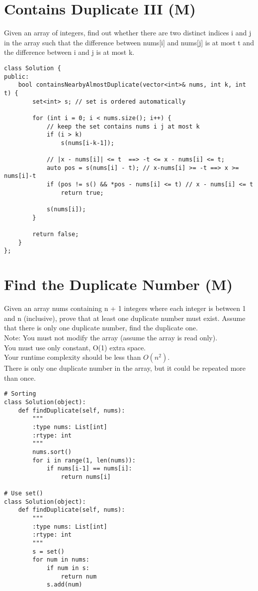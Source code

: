 \section{Contains Duplicate III (M)}
Given an array of integers, find out whether there are two distinct indices i and j in the array such that the difference between nums[i] and nums[j] is at most t and the difference between i and j is at most k. \\

\begin{lstlisting}
class Solution {
public:
    bool containsNearbyAlmostDuplicate(vector<int>& nums, int k, int t) {
        set<int> s; // set is ordered automatically 
        
        for (int i = 0; i < nums.size(); i++) {
            // keep the set contains nums i j at most k
            if (i > k) 
                s(nums[i-k-1]); 
            
            // |x - nums[i]| <= t  ==> -t <= x - nums[i] <= t;
            auto pos = s(nums[i] - t); // x-nums[i] >= -t ==> x >= nums[i]-t 
            if (pos != s() && *pos - nums[i] <= t) // x - nums[i] <= t
                return true;
            
            s(nums[i]);
        }
        
        return false;
    }
};
\end{lstlisting}


\section{Find the Duplicate Number (M)}
Given an array nums containing n + 1 integers where each integer is between 1 and n (inclusive), prove that at least one duplicate number must exist. Assume that there is only one duplicate number, find the duplicate one. \\

Note:
    You must not modify the array (assume the array is read only).\\
    You must use only constant, O(1) extra space.\\
    Your runtime complexity should be less than $O(n^2)$.\\
    There is only one duplicate number in the array, but it could be repeated more than once.\\

\begin{lstlisting}
# Sorting
class Solution(object):
    def findDuplicate(self, nums):
        """
        :type nums: List[int]
        :rtype: int
        """
        nums.sort()
        for i in range(1, len(nums)):
            if nums[i-1] == nums[i]:
                return nums[i]

# Use set()
class Solution(object):
    def findDuplicate(self, nums):
        """
        :type nums: List[int]
        :rtype: int
        """
        s = set()
        for num in nums:
            if num in s:
                return num
            s.add(num)
\end{lstlisting}

